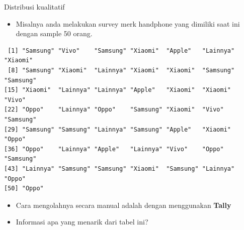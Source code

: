 \documentclass[
  ignorenonframetext,
]{beamer}
\providecommand{\tightlist}{%
  \setlength{\itemsep}{0pt}\setlength{\parskip}{0pt}}\usepackage{longtable,booktabs,array}
\begin{document}
\begin{frame}[fragile]{Distribusi kualitatif}
\label{distribusi-kualitatif}
\begin{itemize}
\tightlist
\item
  Misalnya anda melakukan survey merk handphone yang dimiliki saat ini
  dengan sample 50 orang.
\end{itemize}

\begin{verbatim}
 [1] "Samsung" "Vivo"    "Samsung" "Xiaomi"  "Apple"   "Lainnya" "Xiaomi" 
 [8] "Samsung" "Xiaomi"  "Lainnya" "Xiaomi"  "Xiaomi"  "Samsung" "Samsung"
[15] "Xiaomi"  "Lainnya" "Lainnya" "Apple"   "Xiaomi"  "Xiaomi"  "Vivo"   
[22] "Oppo"    "Lainnya" "Oppo"    "Samsung" "Xiaomi"  "Vivo"    "Samsung"
[29] "Samsung" "Samsung" "Lainnya" "Samsung" "Apple"   "Xiaomi"  "Oppo"   
[36] "Oppo"    "Lainnya" "Apple"   "Lainnya" "Vivo"    "Oppo"    "Samsung"
[43] "Lainnya" "Samsung" "Samsung" "Xiaomi"  "Samsung" "Lainnya" "Oppo"   
[50] "Oppo"   
\end{verbatim}

\begin{itemize}
\item
  Cara mengolahnya secara manual adalah dengan menggunakan
  \textbf{Tally}
\item
  Informasi apa yang menarik dari tabel ini?
\end{itemize}
\end{frame}
\end{document}
